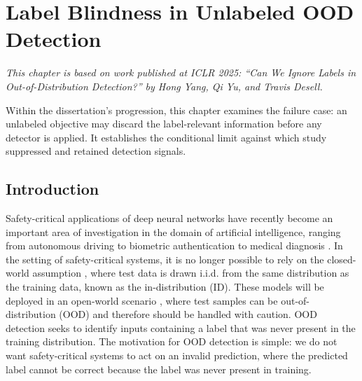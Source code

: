 
\chapter{Label Blindness in Unlabeled OOD Detection}
\label{ch:label-blindness}

\textit{This chapter is based on work published at ICLR 2025: ``Can We Ignore Labels in Out-of-Distribution Detection?'' by Hong Yang, Qi Yu, and Travis Desell.}

Within the dissertation's progression, this chapter examines the failure case:
an unlabeled objective may discard the label-relevant information before any
detector is applied. It establishes the conditional limit against which
 study suppressed
and retained detection signals.

\section{Introduction}

Safety-critical applications of deep neural networks have recently become an important area of investigation in the domain of artificial intelligence, ranging from autonomous driving \citep{ramanagopal2018failing} to biometric authentication \citep{wang2021deep} to medical diagnosis \citep{bakator2018deep}. In the setting of safety-critical systems, it is no longer possible to rely on the closed-world assumption \citep{krizhevsky2012imagenet}, where test data is drawn i.i.d. from the same distribution as the training data, known as the in-distribution (ID). These models will be deployed in an open-world scenario \citep{drummond2006open}, where test samples can be out-of-distribution (OOD) and therefore should be handled with caution. OOD detection seeks to identify inputs containing a label that was never present in the training distribution. The motivation for OOD detection is simple: we do not want safety-critical systems to act on an invalid prediction, where the predicted label cannot be correct because the label was never present in training.

